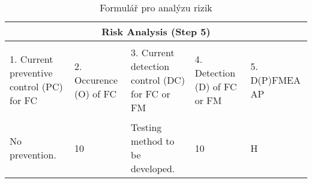 \begin{center}
\begin{table}[h]
	\centering
	\caption{Formulář pro analýzu rizik }
	\label{tab:risk_FMEA}
\begin{tabular}{|p{4cm}|p{0.5cm}|p{4cm}|p{0.5cm}|p{0.5cm}|  }
 \hline
 \multicolumn{5}{|c|}{Risk Analysis (Step 5)} \\
 \hline
1. Current preventive control (PC) for FC
&
  \begin{turn}{-90}2. Occurence (O) of FC\end{turn} &
3. Current detection control (DC) for FC or FM
 &
  \begin{turn}{-90}4. Detection (D) of FC or FM\end{turn}
 &
  \begin{turn}{-90}5. D(P)FMEA AP\end{turn}

\\
 \hline
No prevention.
& 10
& Testing method to be developed.
& 10
& H


\\
 \hline
\end{tabular}\  
\end{table}
\end{center}


